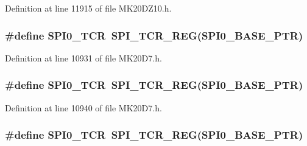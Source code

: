 Definition at line 11915 of file M\+K20\+D\+Z10.\+h.

\subsubsection[{\texorpdfstring{S\+P\+I0\+\_\+\+T\+CR}{SPI0_TCR}}]{\setlength{\rightskip}{0pt plus 5cm}\#define S\+P\+I0\+\_\+\+T\+CR~{\bf S\+P\+I\+\_\+\+T\+C\+R\+\_\+\+R\+EG}({\bf S\+P\+I0\+\_\+\+B\+A\+S\+E\+\_\+\+P\+TR})}\hypertarget{group___s_p_i___register___accessor___macros_ga210fb00eb7662406b9ecf9d26d6b59b7}{}\label{group___s_p_i___register___accessor___macros_ga210fb00eb7662406b9ecf9d26d6b59b7}


Definition at line 10931 of file M\+K20\+D7.\+h.

\subsubsection[{\texorpdfstring{S\+P\+I0\+\_\+\+T\+CR}{SPI0_TCR}}]{\setlength{\rightskip}{0pt plus 5cm}\#define S\+P\+I0\+\_\+\+T\+CR~{\bf S\+P\+I\+\_\+\+T\+C\+R\+\_\+\+R\+EG}({\bf S\+P\+I0\+\_\+\+B\+A\+S\+E\+\_\+\+P\+TR})}\hypertarget{group___s_p_i___register___accessor___macros_ga210fb00eb7662406b9ecf9d26d6b59b7}{}\label{group___s_p_i___register___accessor___macros_ga210fb00eb7662406b9ecf9d26d6b59b7}


Definition at line 10940 of file M\+K20\+D7.\+h.

\subsubsection[{\texorpdfstring{S\+P\+I0\+\_\+\+T\+CR}{SPI0_TCR}}]{\setlength{\rightskip}{0pt plus 5cm}\#define S\+P\+I0\+\_\+\+T\+CR~{\bf S\+P\+I\+\_\+\+T\+C\+R\+\_\+\+R\+EG}({\bf S\+P\+I0\+\_\+\+B\+A\+S\+E\+\_\+\+P\+TR})}\hypertarget{group___s_p_i___register___accessor___macros_ga210fb00eb7662406b9ecf9d26d6b59b7}{}\label{group___s_p_i___register___accessor___macros_ga210fb00eb7662406b9ecf9d26d6b59b7}


